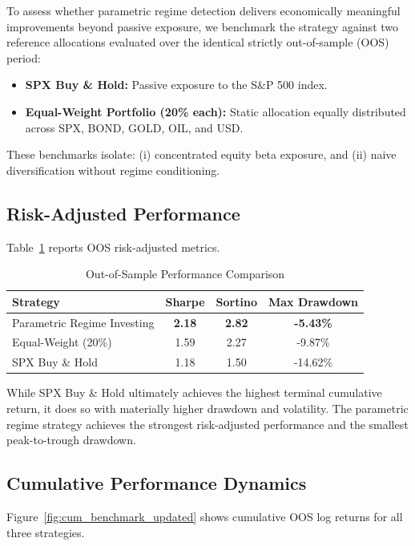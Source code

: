 \documentclass[11pt]{article}
\begin{document}
To assess whether parametric regime detection delivers economically meaningful improvements beyond passive exposure, we benchmark the strategy against two reference allocations evaluated over the identical strictly out-of-sample (OOS) period:

\begin{itemize}
    \item \textbf{SPX Buy \& Hold:} Passive exposure to the S\&P 500 index.
    \item \textbf{Equal-Weight Portfolio (20\% each):} Static allocation equally distributed across SPX, BOND, GOLD, OIL, and USD.
\end{itemize}
These benchmarks isolate:
(i) concentrated equity beta exposure, and  
(ii) naive diversification without regime conditioning.

\subsection{Risk-Adjusted Performance}

Table~\ref{tab:benchmark_performance_updated} reports OOS risk-adjusted metrics.

\begin{table}[H]
\centering
\caption{Out-of-Sample Performance Comparison}
\label{tab:benchmark_performance_updated}
\begin{tabular}{lccc}
\toprule
Strategy & Sharpe & Sortino & Max Drawdown \\
\midrule
Parametric Regime Investing & \textbf{2.18} & \textbf{2.82} & \textbf{-5.43\%} \\
Equal-Weight (20\%) & 1.59 & 2.27 & -9.87\% \\
SPX Buy \& Hold & 1.18 & 1.50 & -14.62\% \\
\bottomrule
\end{tabular}
\end{table}
While SPX Buy \& Hold ultimately achieves the highest terminal cumulative return, it does so with materially higher drawdown and volatility.
The parametric regime strategy achieves the strongest risk-adjusted performance and the smallest peak-to-trough drawdown.

\subsection{Cumulative Performance Dynamics}

Figure~\ref{fig:cum_benchmark_updated} shows cumulative OOS log returns for all three strategies.
\end{document}
